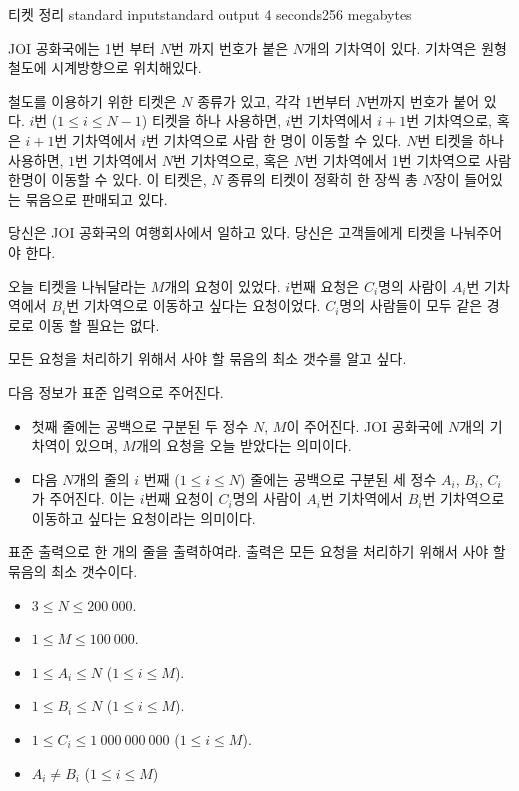 \begin{problem}{티켓 정리}
	{standard input}{standard output}
	{4 seconds}{256 megabytes}{}
	
	JOI 공화국에는 1번 부터 $N$번 까지 번호가 붙은 $N$개의 기차역이 있다. 기차역은 원형 철도에 시계방향으로 위치해있다.
	
	철도를 이용하기 위한 티켓은 $N$ 종류가 있고, 각각 1번부터 $N$번까지 번호가 붙어 있다. $i$번 ($1 \le i \le N-1$) 티켓을 하나 사용하면, $i$번 기차역에서 $i+1$번 기차역으로, 혹은 $i+1$번 기차역에서 $i$번 기차역으로 사람 한 명이 이동할 수 있다. $N$번 티켓을 하나 사용하면, $1$번 기차역에서 $N$번 기차역으로, 혹은 $N$번 기차역에서 1번 기차역으로 사람 한명이 이동할 수 있다. 이 티켓은, $N$ 종류의 티켓이 정확히 한 장씩 총 $N$장이 들어있는 묶음으로 판매되고 있다.
	
	당신은 JOI 공화국의 여행회사에서 일하고 있다. 당신은 고객들에게 티켓을 나눠주어야 한다.
	
	오늘 티켓을 나눠달라는 $M$개의 요청이 있었다. $i$번째 요청은 $C_i$명의 사람이 $A_i$번 기차역에서 $B_i$번 기차역으로 이동하고 싶다는 요청이었다. $C_i$명의 사람들이 모두 같은 경로로 이동 할 필요는 없다.
	
	모든 요청을 처리하기 위해서 사야 할 묶음의 최소 갯수를 알고 싶다.

	\InputFile
	
	다음 정보가 표준 입력으로 주어진다.
	
	\begin{itemize}
		\item 첫째 줄에는 공백으로 구분된 두 정수 $N$, $M$이 주어진다. JOI 공화국에 $N$개의 기차역이 있으며, $M$개의 요청을 오늘 받았다는 의미이다.
		\item 다음 $N$개의 줄의 $i$ 번째 ($1 \le i \le N$) 줄에는 공백으로 구분된 세 정수 $A_i$, $B_i$, $C_i$가 주어진다. 이는 $i$번째 요청이 $C_i$명의 사람이 $A_i$번 기차역에서 $B_i$번 기차역으로 이동하고 싶다는 요청이라는 의미이다.
	\end{itemize}

	
	\OutputFile
	
	표준 출력으로 한 개의 줄을 출력하여라. 출력은 모든 요청을 처리하기 위해서 사야 할 묶음의 최소 갯수이다.
	
	\Constraints
	
	\begin{itemize}
	
	\item $3 \le N \le 200\ 000$.
	\item $1 \le M \le 100\ 000$.
	\item $1 \le A_i \le N$ ($1 \le i \le M$).
	\item $1 \le B_i \le N$ ($1 \le i \le M$).
	\item $1 \le C_i \le 1\ 000\ 000\ 000$ ($1 \le i \le M$).
	\item $A_i \ne B_i$ ($1 \le i \le M$)
	\end{itemize}
	

\end{problem}
